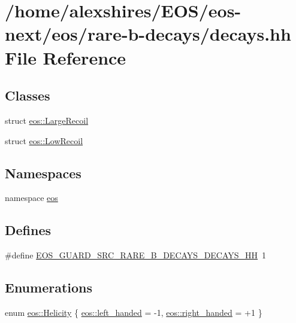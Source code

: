 \hypertarget{decays_8hh}{
\section{/home/alexshires/EOS/eos-\/next/eos/rare-\/b-\/decays/decays.hh File Reference}
\label{decays_8hh}
}
\subsection*{Classes}
\begin{DoxyCompactItemize}
\item 
struct \hyperlink{structeos_1_1LargeRecoil}{eos::LargeRecoil}
\item 
struct \hyperlink{structeos_1_1LowRecoil}{eos::LowRecoil}
\end{DoxyCompactItemize}
\subsection*{Namespaces}
\begin{DoxyCompactItemize}
\item 
namespace \hyperlink{namespaceeos}{eos}
\end{DoxyCompactItemize}
\subsection*{Defines}
\begin{DoxyCompactItemize}
\item 
\#define \hyperlink{decays_8hh_a94af5ab57ee3f750d538b5a4c5b577dd}{EOS\_\-GUARD\_\-SRC\_\-RARE\_\-B\_\-DECAYS\_\-DECAYS\_\-HH}~1
\end{DoxyCompactItemize}
\subsection*{Enumerations}
\begin{DoxyCompactItemize}
\item 
enum \hyperlink{namespaceeos_a4b2f8b0a4184d635cfc47c4ee234aea5}{eos::Helicity} \{ \hyperlink{namespaceeos_a4b2f8b0a4184d635cfc47c4ee234aea5a01df88b4e8525e89646a0bd5d0fdbd01}{eos::left\_\-handed} =  -\/1, 
\hyperlink{namespaceeos_a4b2f8b0a4184d635cfc47c4ee234aea5ae7094996100231c5a5583bb323488b18}{eos::right\_\-handed} =  +1
 \}
\end{DoxyCompactItemize}


